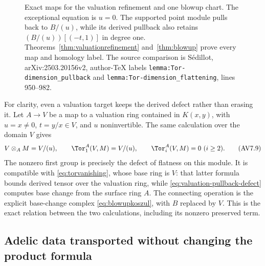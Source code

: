 \documentclass[11pt,a4paper]{article}
\theoremstyle{definition}\newtheorem{definition}[theorem]{Definition}
\begin{document}
\begin{figure}[ht]
\centering
{}
\caption{Exact maps for the valuation refinement and one blowup chart.
The exceptional equation is $u=0$. The supported point module pulls
back to $B/(u)$, while its derived pullback also retains
$(B/(u))[(-t,1)]$ in degree one. Theorems~\ref{thm:valuationrefinement}
and~\ref{thm:blowup} prove every map and homology label. The source
comparison is S\'edillot, arXiv:2503.20156v2, author-TeX labels
\nolinkurl{lemma:Tor-dimension_pullback} and
\nolinkurl{lemma:Tor-dimension_flattening}, lines 950--982.}
\end{figure}

For clarity, even a valuation target keeps the derived defect rather
than erasing it. Let $A\to V$ be a map to a valuation ring contained in
$K(x,y)$, with $u=x\ne0$, $t=y/x\in V$, and $u$ noninvertible. The same
calculation over the domain $V$ gives
\[
 V\otimes_A M=V/(u),\qquad
 \Tor_1^A(V,M)=V/(u),\qquad \Tor_i^A(V,M)=0\ (i\ge2).
 \tag{AV7.9}\label{eq:valuation-pullback-defect}
\]
The nonzero first group is precisely the defect of flatness on this
module. It is compatible with \eqref{eq:torvanishing}, whose base ring
is $V$: that latter formula bounds derived tensor over the valuation
ring, while \eqref{eq:valuation-pullback-defect} computes base change
from the surface ring $A$. The connecting operation is the explicit
base-change complex \eqref{eq:blowupkoszul}, with $B$ replaced by $V$.
This is the exact relation between the two calculations, including its
nonzero preserved term.

\subsection{Adelic data transported without changing the product formula}
\end{document}
